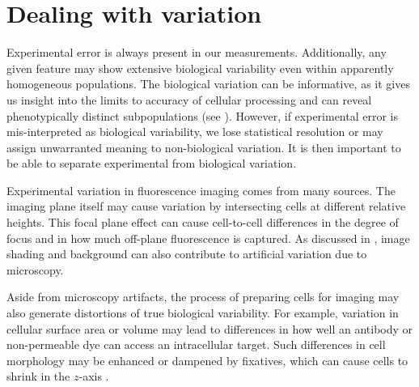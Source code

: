 \section{Dealing with variation}
\label{imaging:variation}


Experimental error is always present in our
measurements. Additionally, any given feature
may show extensive biological variability even within
apparently homogeneous populations. The biological
variation can be informative, as it gives us
insight into the limits to accuracy of cellular
processing and can reveal phenotypically distinct
subpopulations (see ).
However, if experimental error is mis-interpreted
as biological variability, we lose statistical resolution
or may assign unwarranted meaning to non-biological
variation. It is then important to be able to separate
experimental from biological variation.


Experimental variation in fluorescence imaging
comes from many sources.
The imaging plane itself may cause
variation by intersecting cells at different
relative heights. This focal plane effect
can cause cell-to-cell differences in the
degree of focus and in how much off-plane
fluorescence is captured. As discussed
in , image shading and
background can also contribute to artificial variation
due to microscopy.


Aside from microscopy artifacts, the process
of preparing cells for imaging may also
generate distortions of true biological variability.
For example, variation in cellular surface
area or volume may lead to differences
in how well an antibody or non-permeable dye
can access an intracellular target.
Such differences in cell morphology may be
enhanced or dampened by fixatives, which can cause cells to shrink
in the $z$-axis \cite{Pawly2006}.


